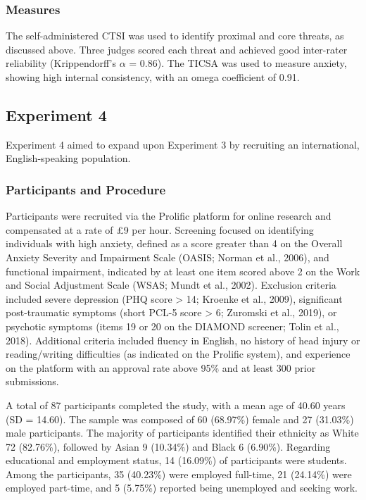\documentclass[
  man,floatsintext]{apa7}
\begin{document}
\subsubsection{Measures}\label{measures-3}

The self-administered CTSI was used to identify proximal and core threats, as discussed above.
Three judges scored each threat and achieved good inter-rater reliability (Krippendorff's \(\alpha\) = 0.86).
The TICSA was used to measure anxiety, showing high internal consistency, with an omega coefficient of 0.91.

\subsection{Experiment 4}\label{experiment-4}

Experiment 4 aimed to expand upon Experiment 3 by recruiting an international, English-speaking population.

\subsubsection{Participants and Procedure}\label{participants-and-procedure-1}

Participants were recruited via the Prolific platform for online research and compensated at a rate of £9 per hour.
Screening focused on identifying individuals with high anxiety, defined as a score greater than 4 on the Overall Anxiety Severity and Impairment Scale (OASIS; Norman et al., 2006), and functional impairment, indicated by at least one item scored above 2 on the Work and Social Adjustment Scale (WSAS; Mundt et al., 2002).
Exclusion criteria included severe depression (PHQ score \textgreater{} 14; Kroenke et al., 2009), significant post-traumatic symptoms (short PCL-5 score \textgreater{} 6; Zuromski et al., 2019), or psychotic symptoms (items 19 or 20 on the DIAMOND screener; Tolin et al., 2018).
Additional criteria included fluency in English, no history of head injury or reading/writing difficulties (as indicated on the Prolific system), and experience on the platform with an approval rate above 95\% and at least 300 prior submissions.

A total of 87 participants completed the study, with a mean age of 40.60 years (SD = 14.60).
The sample was composed of 60 (68.97\%) female and 27 (31.03\%) male participants.
The majority of participants identified their ethnicity as White 72 (82.76\%), followed by Asian 9 (10.34\%) and Black 6 (6.90\%).
Regarding educational and employment status, 14 (16.09\%) of participants were students.
Among the participants, 35 (40.23\%) were employed full-time, 21 (24.14\%) were employed part-time, and 5 (5.75\%) reported being unemployed and seeking work.
\end{document}
